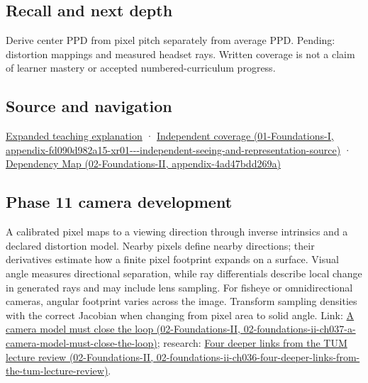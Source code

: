 \subsection{Recall and next depth}\label{appendix-7d356c396d1a-recall-and-next-depth}

Derive center PPD from pixel pitch separately from average PPD. Pending: distortion mappings and measured headset rays. Written coverage is not a claim of learner mastery or accepted numbered-curriculum progress.

\subsection{Source and navigation}\label{appendix-7d356c396d1a-source-and-navigation}

\href{Continuous\%20Notes/University\%20-\%20Worlds,\%20Images\%20and\%20Inference\%20-\%20Graphics,\%20Vision\%20and\%20Photography\#Angles\%20connect\%20display\%20samples\%20to\%20a\%20viewer}{Expanded teaching explanation} · \href{../01-Foundations-I/main.pdf\#nameddest=appendix-fd090d982a15-xr01---independent-seeing-and-representation-source}{Independent coverage (01-Foundations-I, appendix-fd090d982a15-xr01-\/-\/-independent-seeing-and-representation-source)} · \href{../02-Foundations-II/main.pdf\#nameddest=appendix-4ad47bdd269a}{Dependency Map (02-Foundations-II, appendix-4ad47bdd269a)}

\subsection{Phase 11 camera development}\label{appendix-7d356c396d1a-phase-11-camera-development}

A calibrated pixel maps to a viewing direction through inverse intrinsics and a declared distortion model. Nearby pixels define nearby directions; their derivatives estimate how a finite pixel footprint expands on a surface. Visual angle measures directional separation, while ray differentials describe local change in generated rays and may include lens sampling. For fisheye or omnidirectional cameras, angular footprint varies across the image. Transform sampling densities with the correct Jacobian when changing from pixel area to solid angle. Link: \href{../02-Foundations-II/main.pdf\#nameddest=02-foundations-ii-ch037-a-camera-model-must-close-the-loop}{A camera model must close the loop (02-Foundations-II, 02-foundations-ii-ch037-a-camera-model-must-close-the-loop)}; research: \href{../02-Foundations-II/main.pdf\#nameddest=02-foundations-ii-ch036-four-deeper-links-from-the-tum-lecture-review}{Four deeper links from the TUM lecture review (02-Foundations-II, 02-foundations-ii-ch036-four-deeper-links-from-the-tum-lecture-review)}.
